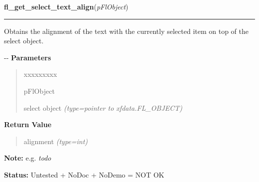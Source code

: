     \label{xformslib:flselect:fl_get_select_text_align}

    \vspace{0.5ex}

\hspace{.8\funcindent}\begin{boxedminipage}{\funcwidth}

    \raggedright \textbf{fl\_get\_select\_text\_align}(\textit{pFlObject})

    \vspace{-1.5ex}

    \rule{\textwidth}{0.5\fboxrule}
\setlength{\parskip}{2ex}

Obtains the alignment of the text with the currently selected item
on top of the select object.

-{}-
\setlength{\parskip}{1ex}
      \textbf{Parameters}
      \vspace{-1ex}

      \begin{quote}
        \begin{Ventry}{xxxxxxxxx}

          \item[pFlObject]


select object
            {\it (type=pointer to xfdata.FL\_OBJECT)}

        \end{Ventry}

      \end{quote}

      \textbf{Return Value}
    \vspace{-1ex}

      \begin{quote}

alignment
      {\it (type=int)}

      \end{quote}

\textbf{Note:} 
e.g. \emph{todo}


\textbf{Status:} 
Untested + NoDoc + NoDemo = NOT OK


    \end{boxedminipage}

    \label{xformslib:flselect:fl_set_select_text_align}

